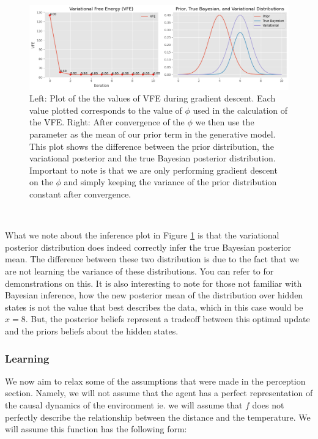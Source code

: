 \documentclass{article}
\begin{document}
\begin{figure}[htbp]
    \centering
    \includegraphics[scale=0.55]{images/pc_example_perception.png}
    \caption{Left: Plot of the the values of VFE during gradient descent. Each value plotted corresponds to the value of $\phi$ used in the calculation of the VFE. Right: After convergence of the $\phi$ we then use the parameter as the mean of our prior term in the generative model. This plot shows the difference between the prior distribution, the variational posterior and the true Bayesian posterior distribution. Important to note is that we are only performing gradient descent on the $\phi$ and simply keeping the variance of the prior distribution constant after convergence.}
    \label{fig:pc_example_perception}
\end{figure}

\

What we note about the inference plot in Figure \ref{fig:pc_example_perception} is that the variational posterior distribution does indeed correctly infer the true Bayesian posterior mean. The difference between these two distribution is due to the fact that we are not learning the variance of these distributions. You can refer to \citet{bogacz2017tutorial, friston2003learning} for demonstrations on this. It is also interesting to note for those not familiar with Bayesian inference, how the new posterior mean of the distribution over hidden states is not the value that best describes the data, which in this case would be $x = 8$. But, the posterior beliefs represent a tradeoff between this optimal update and the priors beliefs about the hidden states.

\subsubsection{Learning}

We now aim to relax some of the assumptions that were made in the perception section. Namely, we will not assume that the agent has a perfect representation of the causal dynamics of the environment ie. we will assume that $f$ does not perfectly describe the relationship between the distance and the temperature. We will assume this function has the following form:
\end{document}

